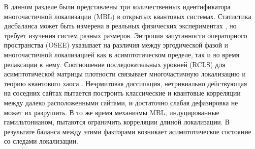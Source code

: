 В данном разделе были представлены три количественных идентификатора многочастичной локализации (MBL) в открытых квантовых системах.
Статистика дисбаланса может быть измерена в реальных физических экспериментах \cite{Schreiber2015, Choi2016, Bordia2017, Lschen2017}, но требует изучения систем разных размеров. 
Энтропия запутанности операторного пространства (OSEE) указывает на различия между эргодической фазой и многочастичной локализацией как в асимптотическом пределе, так и во время релаксации к нему.
Соотношение последовательных уровней (RCLS) для асимптотической матрицы плотности связывает многочастичную локализацию и теорию квантового хаоса \cite{Prosen2013, Haake2018}. 
Неэрмитовая диссипация, нетривиально действующая на соседних сайтах пытается построить классические и квантовые корреляции между далеко расположенными сайтами, и достаточно слабая дефазировка не может их разрушить. 
В то же время механизмы MBL, индуцированные гамильтонианом, пытаются ограничить корреляции длиной локализации. 
В результате баланса между этими факторами возникает асимптотическое состояние со следами локализации.

